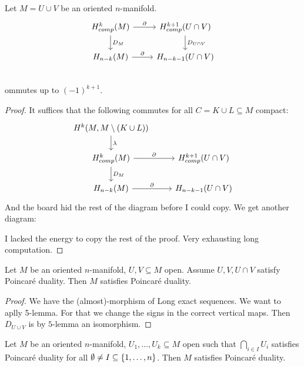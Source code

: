 \documentclass[language=english]{TemplateLecture}
\begin{document}
\begin{proposition}
    Let \(M = U \cup V\) be an oriented \(n\)-manifold.
    \[\begin{tikzcd}
        H_{comp}^k(M) \ar[r, "\partial"] \ar[d, "D_M"] & H_{comp}^{k+1}(U \cap V) \ar[d, "D_{U \cap V}"] \\
        H_{n-k}(M) \ar[r, "\partial"] & H_{n-k-1}(U \cap V) \\
    \end{tikzcd}\]
    ommutes up to \((-1)^{k+1}\).
\end{proposition}
\begin{proof}
    It suffices that the following commutes for all \(C = K \cup L \subseteq M\) compact:
    \[\begin{tikzcd}
        H^k(M,M \setminus (K \cup L))  \ar[d, "\lambda"] & \\
        H_{comp}^k(M) \ar[d, "D_M"] \ar[r, "\partial"] & H_{comp}^{k+1}(U \cap V) \\
        H_{n-k}(M) \ar[r, "\partial"] & H_{n-k-1}(U \cap V) 
    \end{tikzcd}\]
    And the board hid the rest of the diagram before I could copy. We get another diagram:

    I lacked the energy to copy the rest of the proof. Very exhausting long computation.
\end{proof}

\begin{corollary}
    Let \(M\) be an oriented \(n\)-manifold, \(U, V \subseteq M\) open. Assume \(U, V, U \cap V\) satisfy Poincaré duality. Then \(M\) satisfies Poincaré duality.
\end{corollary}

\begin{proof}
    We have the (almost)-morphism of Long exact sequences. We want to aplly 5-lemma. For that we change the signs in the correct vertical maps. Then \(D_{U \cup V}\) is by \(5\)-lemma an isomorphism.
\end{proof}

\begin{corollary}
    Let \(M\) be an oriented \(n\)-manifold, \(U_1, \dots, U_k \subseteq M\) open such that \(\bigcap_{i \in I} U_i\) satisfies Poincaré duality for all \(\emptyset \neq I \subseteq \{1, \dots, n\}\). Then \(M\) satisfies Poincaré duality.
\end{corollary}



\end{document}
